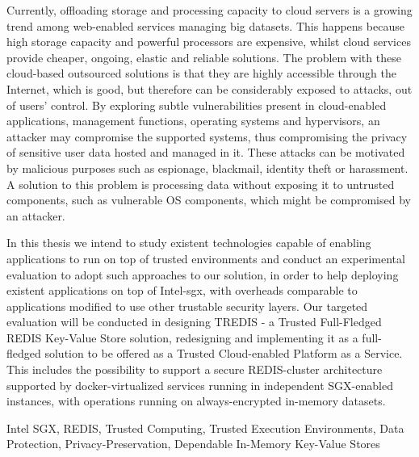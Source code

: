 
Currently, offloading storage and processing capacity to cloud servers is a growing trend among web-enabled services managing big datasets. This happens because high storage capacity and powerful processors are expensive, whilst cloud services provide cheaper, ongoing, elastic and reliable solutions. The problem with these cloud-based outsourced solutions is that they are highly accessible through the Internet, which is good, but therefore can be considerably exposed to attacks, out of users’ control. By exploring subtle vulnerabilities present in cloud-enabled applications, management functions, operating systems and hypervisors, an attacker may compromise the supported systems, thus compromising the privacy of sensitive user data hosted and managed in it. These attacks can be motivated by malicious purposes such as espionage, blackmail, identity theft or harassment. A solution to this problem is processing data without exposing it to untrusted components, such as vulnerable OS components, which might be compromised by an attacker.
 

In this thesis we intend to study existent technologies capable of enabling applications to run on top of trusted environments and conduct an experimental evaluation to adopt such approaches to our solution, in order to help deploying existent applications on top of Intel-\gls{sgx}, with overheads comparable to applications modified to use other trustable security layers. 
Our targeted evaluation will be conducted in designing TREDIS - a Trusted Full-Fledged REDIS Key-Value Store solution, redesigning and implementing it as a full-fledged solution to be offered as a Trusted Cloud-enabled Platform as a Service. This includes the possibility to support a secure REDIS-cluster architecture supported by docker-virtualized services running in independent SGX-enabled instances, with operations running on always-encrypted in-memory datasets. 
\begin{keywords}
Intel SGX, REDIS, Trusted Computing, Trusted Execution Environments, Data Protection, Privacy-Preservation, Dependable In-Memory Key-Value Stores
\end{keywords} 


